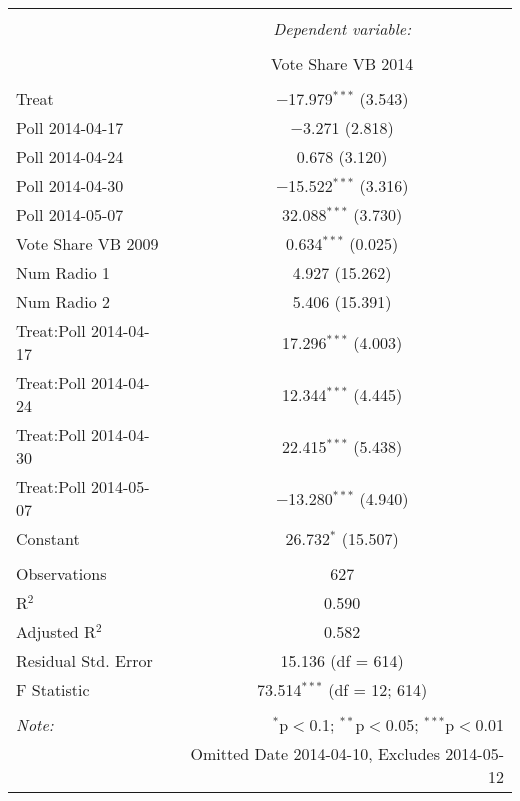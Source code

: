 
\begin{table}[!htbp] \centering 
\begin{tabular}{@{\extracolsep{5pt}}lc} 
\\[-1.8ex]\hline 
\hline \\[-1.8ex] 
 & \multicolumn{1}{c}{\textit{Dependent variable:}} \\ 
\cline{2-2} 
\\[-1.8ex] & Vote Share VB 2014 \\ 
\hline \\[-1.8ex] 
 Treat & $-$17.979$^{***}$ (3.543) \\ 
  Poll 2014-04-17 & $-$3.271 (2.818) \\ 
  Poll 2014-04-24 & 0.678 (3.120) \\ 
  Poll 2014-04-30 & $-$15.522$^{***}$ (3.316) \\ 
  Poll 2014-05-07 & 32.088$^{***}$ (3.730) \\ 
  Vote Share VB 2009 & 0.634$^{***}$ (0.025) \\ 
  Num Radio 1 & 4.927 (15.262) \\ 
  Num Radio 2 & 5.406 (15.391) \\ 
  Treat:Poll 2014-04-17 & 17.296$^{***}$ (4.003) \\ 
  Treat:Poll 2014-04-24 & 12.344$^{***}$ (4.445) \\ 
  Treat:Poll 2014-04-30 & 22.415$^{***}$ (5.438) \\ 
  Treat:Poll 2014-05-07 & $-$13.280$^{***}$ (4.940) \\ 
  Constant & 26.732$^{*}$ (15.507) \\ 
 \hline \\[-1.8ex] 
Observations & 627 \\ 
R$^{2}$ & 0.590 \\ 
Adjusted R$^{2}$ & 0.582 \\ 
Residual Std. Error & 15.136 (df = 614) \\ 
F Statistic & 73.514$^{***}$ (df = 12; 614) \\ 
\hline 
\hline \\[-1.8ex] 
\textit{Note:}  & \multicolumn{1}{r}{$^{*}$p$<$0.1; $^{**}$p$<$0.05; $^{***}$p$<$0.01} \\ 
 & \multicolumn{1}{r}{Omitted Date 2014-04-10, Excludes 2014-05-12} \\ 
\end{tabular} 
\end{table} 
